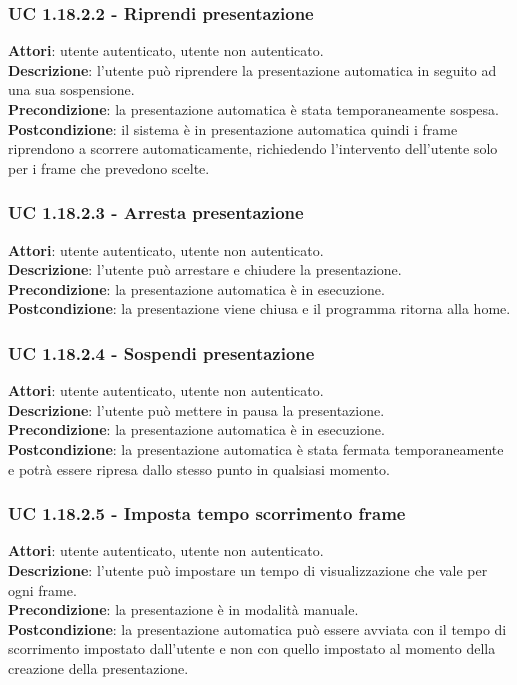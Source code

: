 	\subsubsection{UC 1.18.2.2 - Riprendi presentazione}{
		\label{uc1.18.2.2}
		\textbf{Attori}: utente autenticato, utente non autenticato. \\
		\textbf{Descrizione}: l'utente può riprendere la presentazione automatica in seguito ad una sua sospensione. \\
		\textbf{Precondizione}: la presentazione automatica è stata temporaneamente sospesa.	\\
		\textbf{Postcondizione}: il sistema è in presentazione automatica quindi i frame riprendono a scorrere automaticamente, richiedendo l'intervento dell'utente solo per i frame che prevedono scelte.	\\
	}
	\subsubsection{UC 1.18.2.3 - Arresta presentazione}{
		\label{uc1.18.2.3}
		\textbf{Attori}: utente autenticato, utente non autenticato. \\
		\textbf{Descrizione}: l'utente può arrestare e chiudere la presentazione. \\
		\textbf{Precondizione}: la presentazione automatica è in esecuzione.	\\
		\textbf{Postcondizione}: la presentazione viene chiusa e il programma ritorna alla home.	\\
	}
	\subsubsection{UC 1.18.2.4 - Sospendi presentazione}{
		\label{uc1.18.2.4}
		\textbf{Attori}: utente autenticato, utente non autenticato. \\
		\textbf{Descrizione}: l'utente può mettere in pausa la presentazione. \\
		\textbf{Precondizione}: la presentazione automatica è in esecuzione.	\\
		\textbf{Postcondizione}: la presentazione automatica è stata fermata temporaneamente e potrà essere ripresa dallo stesso punto in qualsiasi momento.	\\
	}
	\subsubsection{UC 1.18.2.5 - Imposta tempo scorrimento frame}{
		\label{uc1.18.2.5}
		\textbf{Attori}: utente autenticato, utente non autenticato. \\
		\textbf{Descrizione}: l'utente può impostare un tempo di visualizzazione che vale per ogni frame. \\
		\textbf{Precondizione}: la presentazione è in modalità manuale.	\\
		\textbf{Postcondizione}: la presentazione automatica può essere avviata con il tempo di scorrimento impostato dall'utente e non con quello impostato al momento della creazione della presentazione.	\\
	}
